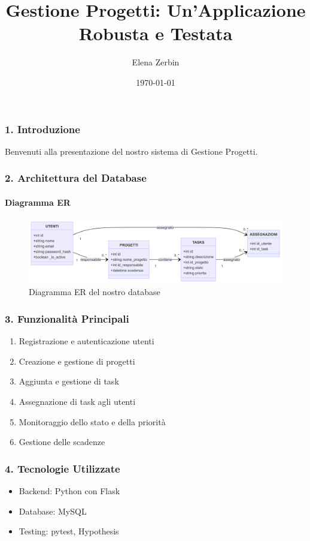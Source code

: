 \documentclass{beamer}
\title{Gestione Progetti: Un'Applicazione Robusta e Testata}
\author{Elena Zerbin}
\date{\today}
\begin{document}
\frame{\titlepage}

\begin{frame}
\frametitle{1. Introduzione}
Benvenuti alla presentazione del nostro sistema di Gestione Progetti.
\end{frame}

\begin{frame}
\frametitle{2. Architettura del Database}
\framesubtitle{Diagramma ER}
\begin{figure}
\includegraphics[width=\textwidth]{diagramma_ER.png}
\caption{Diagramma ER del nostro database}
\end{figure}
\end{frame}

\begin{frame}
\frametitle{3. Funzionalità Principali}
\begin{enumerate}
\item Registrazione e autenticazione utenti
\item Creazione e gestione di progetti
\item Aggiunta e gestione di task
\item Assegnazione di task agli utenti
\item Monitoraggio dello stato e della priorità
\item Gestione delle scadenze
\end{enumerate}
\end{frame}

\begin{frame}
\frametitle{4. Tecnologie Utilizzate}
\begin{itemize}
\item Backend: Python con Flask
\item Database: MySQL
\item Testing: pytest, Hypothesis
\end{itemize}
\end{frame}
\end{document}
